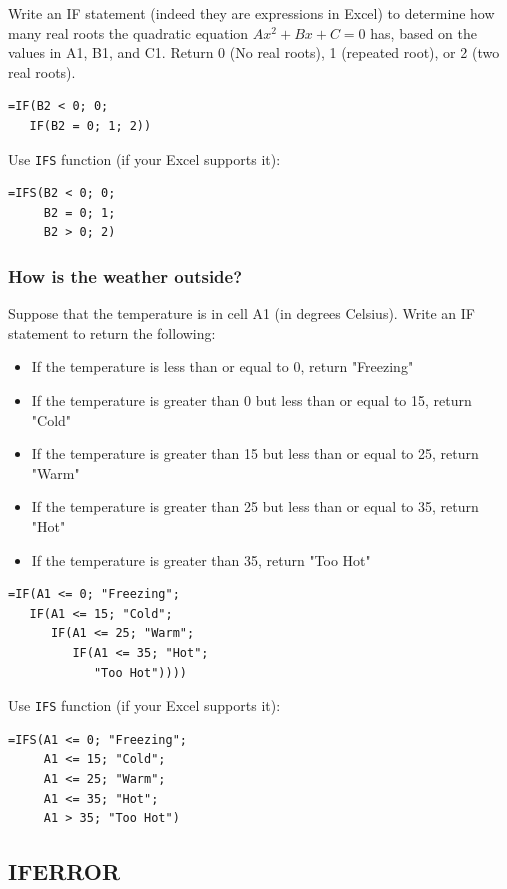 \documentclass{article}
\begin{document}
Write an IF statement (indeed they are expressions in Excel) to determine how many real roots the 
quadratic equation $Ax^2 + Bx + C = 0$ has, based on the values in A1, B1, and C1. 
Return 0 (No real roots), 1 (repeated root), or 2 (two real roots).


\begin{verbatim}
=IF(B2 < 0; 0; 
   IF(B2 = 0; 1; 2))
\end{verbatim}

\noindent Use \texttt{IFS} function (if your Excel supports it):

\begin{verbatim}
=IFS(B2 < 0; 0;
     B2 = 0; 1;
     B2 > 0; 2)
\end{verbatim} 

\subsubsection{How is the weather outside?}
Suppose that the temperature is in cell A1 (in degrees Celsius). 
Write an IF statement to return the following:
\begin{itemize}
\item If the temperature is less than or equal to 0, return "Freezing"
\item If the temperature is greater than 0 but less than or equal to 15, return "Cold"
\item If the temperature is greater than 15 but less than or equal to 25, return "Warm"
\item If the temperature is greater than 25 but less than or equal to 35, return "Hot"
\item If the temperature is greater than 35, return "Too Hot"
\end{itemize}

\begin{verbatim}
=IF(A1 <= 0; "Freezing";
   IF(A1 <= 15; "Cold";
      IF(A1 <= 25; "Warm";
         IF(A1 <= 35; "Hot";
            "Too Hot"))))
\end{verbatim}


\noindent Use \texttt{IFS} function (if your Excel supports it):

\begin{verbatim}
=IFS(A1 <= 0; "Freezing";
     A1 <= 15; "Cold";
     A1 <= 25; "Warm";
     A1 <= 35; "Hot";
     A1 > 35; "Too Hot")
\end{verbatim}




\subsection{IFERROR}
\end{document}
